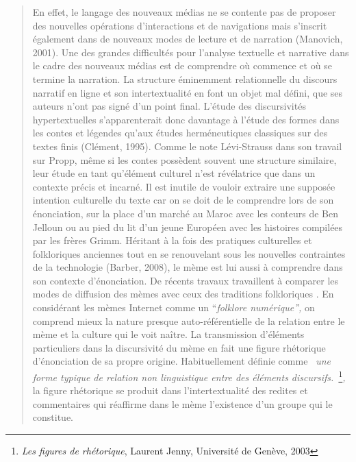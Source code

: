 \begin{quote}
En effet, le langage des nouveaux m\'edias ne se contente pas de proposer des nouvelles op\'erations d{\textquoteright}interactions et de navigations mais s{\textquoteright}inscrit \'egalement dans de nouveaux modes de lecture et de narration (Manovich, 2001). Une des grandes difficult\'es pour l{\textquoteright}analyse textuelle et narrative dans le cadre des nouveaux m\'edias est de comprendre o\`u commence et o\`u se termine la narration. La structure \'eminemment relationnelle du discours narratif en ligne et son intertextualit\'e en font un objet mal d\'efini, que ses auteurs n{\textquoteright}ont pas sign\'e d{\textquoteright}un point final. L{\textquoteright}\'etude des discursivit\'es hypertextuelles s{\textquoteright}apparenterait donc davantage \`a l{\textquoteright}\'etude des formes dans les contes et l\'egendes qu{\textquoteright}aux \'etudes herm\'eneutiques classiques sur des textes finis (Cl\'ement, 1995). Comme le note L\'evi-Strauss dans son travail sur Propp, m\^eme si les contes poss\`edent souvent une structure similaire, leur \'etude en tant qu{\textquoteright}\'el\'ement culturel n{\textquoteright}est r\'ev\'elatrice que dans un contexte pr\'ecis et incarn\'e. Il est inutile de vouloir extraire une suppos\'ee intention culturelle du texte car on se doit de le comprendre lors de son \'enonciation, sur la place d{\textquoteright}un march\'e au Maroc avec les conteurs de Ben Jelloun ou au pied du lit d{\textquoteright}un jeune Europ\'een avec les histoires compil\'ees par les fr\`eres Grimm. H\'eritant \`a la fois des pratiques culturelles et folkloriques anciennes tout en se renouvelant sous les nouvelles contraintes de la technologie (Barber, 2008), le m\`eme est lui aussi \`a comprendre dans son contexte d{\textquoteright}\'enonciation. De r\'ecents travaux travaillent \`a comparer les modes de diffusion des m\`emes avec ceux des traditions folkloriques \cite{De Seta2014}. En consid\'erant les m\`emes Internet comme un {\textquotedblleft}\textit{folklore num\'erique{\textquotedblright}, }on comprend mieux la nature presque auto-r\'ef\'erentielle de la relation entre le m\`eme et la culture qui le voit na\^itre. La transmission d{\textquoteright}\'el\'ements particuliers dans la discursivit\'e du m\`eme en fait une figure rh\'etorique d{\textquoteright}\'enonciation de sa propre origine. Habituellement d\'efinie comme \textit{{\guillemotleft}~une forme typique de relation non linguistique entre des \'el\'ements discursifs.~{\guillemotright}}\footnote{ \textit{Les figures de rh\'etorique}, Laurent Jenny, Universit\'e de Gen\`eve, 2003}\textit{, }la figure rh\'etorique se produit dans l{\textquoteright}intertextualit\'e des redites et commentaires qui r\'eaffirme dans le m\`eme l{\textquoteright}existence d{\textquoteright}un groupe qui le constitue.  

\end{quote}
